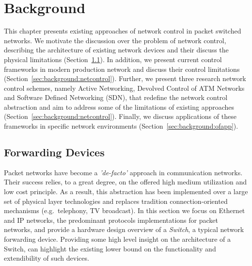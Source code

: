 \chapter{Background} \label{ch:background}


This chapter presents existing approaches of network control in packet switched
networks.  We motivate the discussion over the problem of network control,
describing the architecture of existing network devices and their discuss the physical
limitations (Section~\ref{sec:background:forwarding}). In addition, we present
current control frameworks in modern production network and discuss their
control limitations (Section~\ref{sec:background:netcontrol}). Further, we
present three research network control schemes, namely Active Networking,
Devolved Control of ATM Networks and Software Defined Networking (SDN), that redefine the network
control abstraction and aim to address some of the limitations of existing
approaches (Section~\ref{sec:background:netcontrol}).  Finally, we discuss
applications of these frameworks in specific network environments
(Section~\ref{sec:background:ofapp}).

\section{Forwarding Devices} \label{sec:background:forwarding}

Packet networks have become a \emph{'de-facto'} approach in communication
networks. Their success relies, to a great degree, on the offered high medium
utilization and low cost principle.  As a result, this abstraction has been
implemented over a large set of physical layer technologies and replaces
tradition connection-oriented mechanisms (e.g.~telephony, TV broadcast). In this
section we focus on Ethernet and IP networks, the predominant protocols
implementations for packet networks, and provide a hardware design overview
of a \emph{Switch}, a typical network forwarding device. 
Providing some high level insight on the architecture of a Switch, can
highlight the existing lower bound on the functionality and extendibility of
such devices. 

